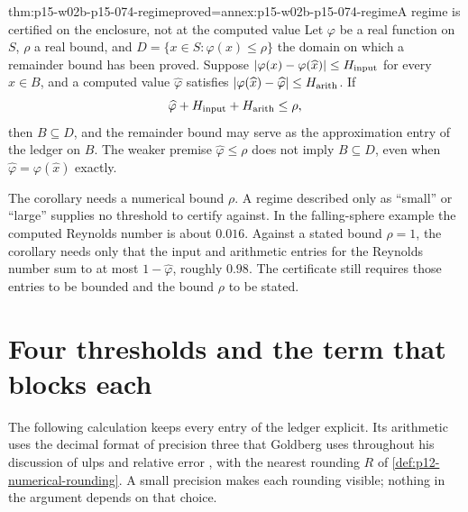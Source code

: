 \begin{hbcorollary}{thm:p15-w02b-p15-074-regime}{proved=annex:p15-w02b-p15-074-regime}{A regime is certified on the enclosure, not at the computed value}
Let \(\varphi\) be a real function on \(S\), \(\rho\) a real bound, and
\(D=\{x\in S:\varphi(x)\leq\rho\}\) the domain on which a remainder bound
has been proved. Suppose \(|\varphi(x)-\varphi(\widehat x)|\leq H_{\rm input}\)
for every \(x\in B\), and a computed value \(\widehat\varphi\) satisfies
\(|\varphi(\widehat x)-\widehat\varphi|\leq H_{\rm arith}\). If
\[
 \widehat\varphi+H_{\rm input}+H_{\rm arith}\leq\rho,
\]
then \(B\subseteq D\), and the remainder bound may serve as the
approximation entry of the ledger on \(B\). The weaker premise
\(\widehat\varphi\leq\rho\) does not imply \(B\subseteq D\), even when
\(\widehat\varphi=\varphi(\widehat x)\) exactly.
\end{hbcorollary}

The corollary needs a numerical bound \(\rho\). A regime described only as
``small'' or ``large'' supplies no threshold to certify against. In the
falling-sphere example the computed Reynolds number is about \(0.016\).
Against a stated bound \(\rho=1\), the corollary needs only that the input
and arithmetic entries for the Reynolds number sum to at most
\(1-\widehat\varphi\), roughly \(0.98\). The certificate still requires
those entries to be bounded and the bound \(\rho\) to be stated.

\section{Four thresholds and the term that blocks each}
\label{sec:p15-w02b-p15-074-four}

The following calculation keeps every entry of the ledger explicit. Its
arithmetic uses the decimal format of precision three that Goldberg uses
throughout his discussion of ulps and relative error
\cite[Section D.3.2]{GoldbergOracle8193693}, with the nearest rounding
\(R\) of \cref{def:p12-numerical-rounding}. A small precision makes each
rounding visible; nothing in the argument depends on that choice.

